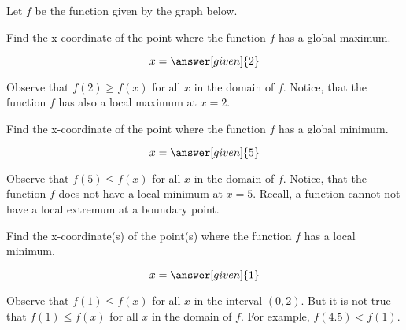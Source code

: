 \documentclass{ximera}
\begin{document}
  Let $f$ be the function given by the graph below. 
  \begin{image}
\end{image}
\begin{question}
\author{Nela Lakos}
  Find the x-coordinate of the point where the function $f$ has a global maximum.
    \begin{prompt}
  \[
 x= \answer[given]{2}
  \]
  \end{prompt}
 
 Observe that $f(2)\ge f(x)$ for all $x$ in the domain of $f$. Notice, that the function $f$  has also a local maximum at $x=2$. 
 
 \begin{question}
 \author{Nela Lakos}

  Find the x-coordinate of the point where the function $f$ has a global minimum.
    \begin{prompt}
  \[
 x= \answer[given]{5}
  \]
  \end{prompt}
 Observe that $f(5)\le f(x)$ for all $x$ in the domain of $f$. Notice, that the function $f$  does not have a local minimum at $x=5$. 
 Recall, a function cannot not have a local extremum  at a boundary point.
\end{question}
\begin{question}
\author{Nela Lakos}

  Find the x-coordinate(s) of the point(s) where the function $f$ has a local minimum.
    \begin{prompt}
  \[
 x= \answer[given]{1}
  \]
  \end{prompt}
 Observe that $f(1)\le f(x)$ for all $x$ in the interval $(0,2)$. But it is not true that $f(1)\le f(x)$ for all $x$ in the domain of $f$. For example, $f(4.5)<f(1)$.
\end{question}
\end{question}
\end{document}
